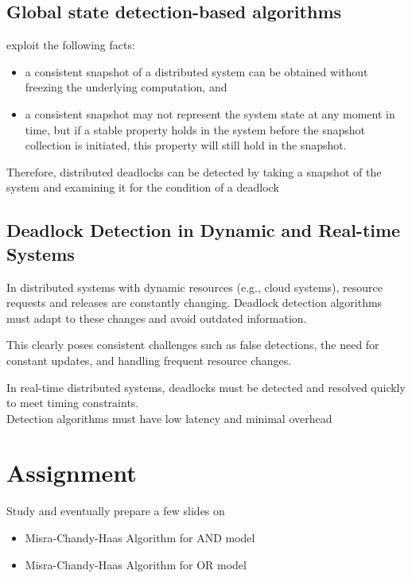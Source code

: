 \subsection{Global state detection-based algorithms}

exploit the following facts:
\begin{itemize}
	\item a consistent snapshot of a distributed system can be
   obtained without freezing the underlying computation,
   and
	\item a consistent snapshot may not represent the system
   state at any moment in time, but if a stable property
   holds in the system before the snapshot collection is
   initiated, this property will still hold in the snapshot.
\end{itemize}

Therefore, distributed deadlocks can be detected by taking
a snapshot of the system and examining it for the condition
of a deadlock



\subsection{Deadlock Detection in Dynamic and Real-time Systems}

In distributed systems with dynamic resources (e.g., cloud systems), resource requests and releases are constantly changing. Deadlock detection algorithms must adapt to these changes and avoid outdated information.

This clearly poses consistent challenges such as false detections, the need for constant
updates, and handling frequent resource changes.


In real-time distributed systems, deadlocks must be detected and resolved quickly to meet timing constraints.\\
Detection algorithms must have low latency and minimal overhead

\section{Assignment}

Study and eventually prepare a few slides on
\begin{itemize}
   \item Misra-Chandy-Haas Algorithm for AND model
   \item Misra-Chandy-Haas Algorithm for OR model
\end{itemize}

